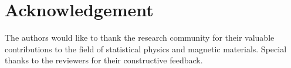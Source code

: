 \documentclass[conference, compsoc, twoside]{IEEEtran}
\begin{document}
\section*{Acknowledgement}

The authors would like to thank the research community for their valuable contributions to the field of statistical physics and magnetic materials. Special thanks to the reviewers for their constructive feedback.

\balance



\end{document}
